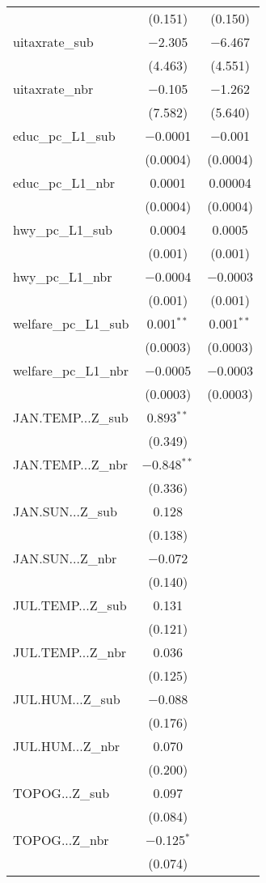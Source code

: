 \begin{table}[!htbp]
\begin{tabular}{@{\extracolsep{5pt}}lcc}
  & (0.151) & (0.150) \\ 
  uitaxrate\_sub & $-$2.305 & $-$6.467 \\ 
  & (4.463) & (4.551) \\ 
  uitaxrate\_nbr & $-$0.105 & $-$1.262 \\ 
  & (7.582) & (5.640) \\ 
  educ\_pc\_L1\_sub & $-$0.0001 & $-$0.001 \\ 
  & (0.0004) & (0.0004) \\ 
  educ\_pc\_L1\_nbr & 0.0001 & 0.00004 \\ 
  & (0.0004) & (0.0004) \\ 
  hwy\_pc\_L1\_sub & 0.0004 & 0.0005 \\ 
  & (0.001) & (0.001) \\ 
  hwy\_pc\_L1\_nbr & $-$0.0004 & $-$0.0003 \\ 
  & (0.001) & (0.001) \\ 
  welfare\_pc\_L1\_sub & 0.001$^{**}$ & 0.001$^{**}$ \\ 
  & (0.0003) & (0.0003) \\ 
  welfare\_pc\_L1\_nbr & $-$0.0005 & $-$0.0003 \\ 
  & (0.0003) & (0.0003) \\ 
  JAN.TEMP...Z\_sub & 0.893$^{**}$ &  \\ 
  & (0.349) &  \\ 
  JAN.TEMP...Z\_nbr & $-$0.848$^{**}$ &  \\ 
  & (0.336) &  \\ 
  JAN.SUN...Z\_sub & 0.128 &  \\ 
  & (0.138) &  \\ 
  JAN.SUN...Z\_nbr & $-$0.072 &  \\ 
  & (0.140) &  \\ 
  JUL.TEMP...Z\_sub & 0.131 &  \\ 
  & (0.121) &  \\ 
  JUL.TEMP...Z\_nbr & 0.036 &  \\ 
  & (0.125) &  \\ 
  JUL.HUM...Z\_sub & $-$0.088 &  \\ 
  & (0.176) &  \\ 
  JUL.HUM...Z\_nbr & 0.070 &  \\ 
  & (0.200) &  \\ 
  TOPOG...Z\_sub & 0.097 &  \\ 
  & (0.084) &  \\ 
  TOPOG...Z\_nbr & $-$0.125$^{*}$ &  \\ 
  & (0.074) &  \\ 

\end{tabular}
\end{table}
